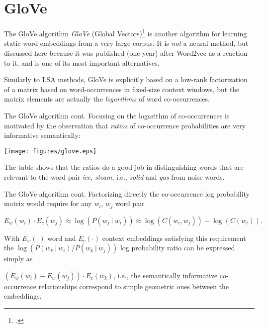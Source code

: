 \documentclass[style=upen, size=14pt]{powerdot}
\newcommand{\gold}{\color{arany}}
\theoremstyle{definition}
\begin{document}
\section{GloVe}


\begin{slide}[toc=Algorithm]{The GloVe algorithm}
  \emph{\gold GloVe} (Global Vectors)\footnote{\cite{pennington2014glove}.} is
  another algorithm for learning static word embeddings from a very large
  corpus. It is \emph{not} a neural method, but discussed here because it was
  published (one year) after Word2vec as a reaction to it, and is one of its
  most important alternatives.\bigskip

  Similarly to LSA methods, GloVe is explicitly based on a low-rank
  factorization of a matrix based on word-occurrences in fixed-size context
  windows, but the matrix elements are actually the \emph{logarithms} of word
  co-occurrences.
\end{slide}

\begin{slide}[toc=]{The GloVe algorithm cont.} 
  Focusing on the logarithm of co-occurrences is motivated by the observation
  that \emph{ratios} of co-occurrence probabilities are very informative
  semantically:
  \begin{center}
    \texttt{[image: figures/glove.eps]}
  \end{center}
  The table shows that the ratios do a good job in distinguishing words that are
  relevant to the word pair \emph{ice}, \emph{steam}, i.e., \emph{solid} and
  \emph{gas} from noise words.
\end{slide}

\begin{slide}[toc=]{The GloVe algorithm cont.} 
  Factorizing directly the co-occurrence log probability matrix would require
  for any $w_i$, $w_j$ word pair
  \begin{small}
    $$
    E_w(w_i)\cdot E_c(w_j)\approx \log (P(w_j~|~ w_i)) \approx \log (C(w_i, w_j)) - \log (C(w_i)).
    $$
  \end{small}
  With $E_w(\cdot)$ word and $E_c(\cdot)$ context embeddings satisfying this
  requirement the $\log(P(w_k~|~w_i)/P(w_k~|~w_j))$ log probability ratio can be
  expressed simply as

  $(E_w(w_i) - E_w(w_j))\cdot E_c(w_k)$, i.e., the semantically informative
  co-occurrence relationships correspond to simple geometric ones between the embeddings.
\end{slide}
\end{document}
